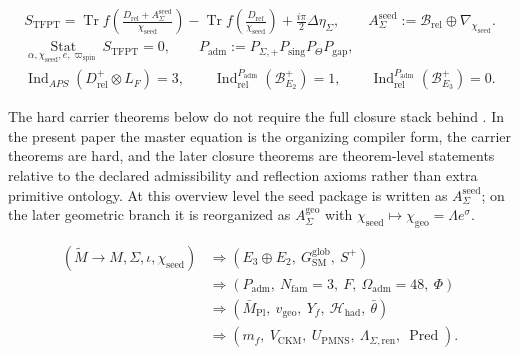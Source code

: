 \documentclass[11pt,a4paper]{article}
\theoremstyle{definition}
\theoremstyle{remark}
\newcommand{\Seam}{\Sigma}
\newcommand{\inv}{\iota}
\newcommand{\Mpl}{\bar M_{\mathrm{Pl}}}
\newcommand{\SM}{\mathrm{SM}}
\newcommand{\Oadm}{\Omega_{\mathrm{adm}}}
\newcommand{\Hhad}{\mathcal H_{\mathrm{had}}}
\newcommand{\Pred}{\operatorname{Pred}}
\newcommand{\chiseed}{\chi_{\mathrm{seed}}}
\newcommand{\chigeo}{\chi_{\mathrm{geo}}}
\newcommand{\vgeo}{v_{\mathrm{geo}}}
\newcommand{\Padm}{P_{\mathrm{adm}}}
\newcommand{\wspin}{\varpi_{\mathrm{spin}}}
\begin{document}
\begin{tcolorbox}[colback=blue!3, colframe=blue!50!black, breakable,
    title={\textbf{TFPT master equation and selectors}}, fonttitle=\bfseries]
\begin{equation}
\label{eq:tfpt-master}
\begin{aligned}
S_{\mathrm{TFPT}}
=
\operatorname{Tr}f\!\left(\frac{D_{\mathrm{rel}}+A_{\Sigma}^{\mathrm{seed}}}{\chiseed}\right)
-
\operatorname{Tr}f\!\left(\frac{D_{\mathrm{ref}}}{\chiseed}\right)
+\frac{i\pi}{2}\Delta\eta_\Sigma,
\qquad
A_{\Sigma}^{\mathrm{seed}}:=\mathcal B_{\mathrm{rel}}\oplus\nabla_{\chiseed}.
\end{aligned}
\end{equation}
\begin{equation}
\label{eq:tfpt-selectors}
\begin{aligned}
\operatorname*{Stat}_{\alpha,\chiseed,e,\wspin}S_{\mathrm{TFPT}}=0,
\qquad
\Padm:=P_{\Seam,+}P_{\mathrm{sing}}P_\Theta P_{\mathrm{gap}},
\\
\operatorname{Ind}_{APS}(D^+_{\mathrm{rel}}\otimes L_F)=3,
\qquad
\operatorname{Ind}^{\Padm}_{\mathrm{rel}}(\mathcal B^+_{E_2})=1,
\qquad
\operatorname{Ind}^{\Padm}_{\mathrm{rel}}(\mathcal B^+_{E_3})=0.
\end{aligned}
\end{equation}
\end{tcolorbox}

The hard carrier theorems below do not require the full closure stack behind . In the present paper the master equation is the organizing compiler form, the carrier theorems are hard, and the later closure theorems are theorem-level statements relative to the declared admissibility and reflection axioms rather than extra primitive ontology. At this overview level the seed package is written as $A_{\Sigma}^{\mathrm{seed}}$; on the later geometric branch it is reorganized as $A_{\Sigma}^{\mathrm{geo}}$ with $\chiseed\mapsto\chigeo=\Lambda e^\sigma$.

\begin{tcolorbox}[colback=blue!3, colframe=blue!50!black, breakable,
    title={\textbf{Carrier-first compiler chain}}, fonttitle=\bfseries]
\begin{equation}
\label{eq:compiler-chain}
\begin{aligned}
(\widetilde M\to M,\Seam,\inv,\chiseed)
&\Rightarrow
(E_3\oplus E_2,\ G_{\SM}^{\mathrm{glob}},\ S^+)\\
&\Rightarrow
( \Padm,\ N_{\mathrm{fam}}=3,\ F,\ \Oadm=48,\ \Phi)\\
&\Rightarrow
( \Mpl,\ \vgeo,\ Y_f,\ \Hhad,\ \bar\theta )\\
&\Rightarrow
(m_f,\ V_{\mathrm{CKM}},\ U_{\mathrm{PMNS}},\ \Lambda_{\Seam,\mathrm{ren}},\ \Pred).
\end{aligned}
\end{equation}
\end{tcolorbox}
\end{document}
